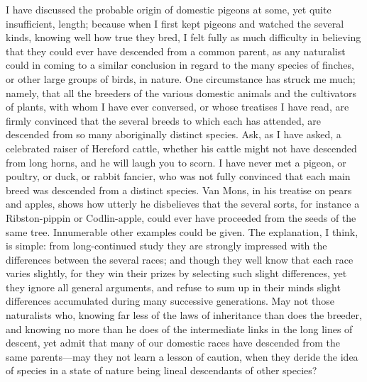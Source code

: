 \documentclass{book}
\begin{document}
I have discussed the probable origin of domestic pigeons at some, yet quite
insufficient, length; because when I first kept pigeons and watched the several
kinds, knowing well how true they bred, I felt fully as much difficulty in
believing that they could ever have descended from a common parent, as any
naturalist could in coming to a similar conclusion in regard to the many
species of finches, or other large groups of birds, in nature. One circumstance
has struck me much; namely, that all the breeders of the various domestic
animals and the cultivators of plants, with whom I have ever conversed, or
whose treatises I have read, are firmly convinced that the several breeds to
which each has attended, are descended from so many aboriginally distinct
species.
Ask, as I have asked, a celebrated raiser of Hereford cattle, whether his
cattle might not have descended from long horns, and he will laugh you to
scorn. I have never met a pigeon, or poultry, or duck, or rabbit fancier, who
was not fully convinced that each main breed was descended from a distinct
species. Van Mons, in his treatise on pears and apples, shows how utterly he
disbelieves that the several sorts, for instance a Ribston-pippin or
Codlin-apple, could ever have proceeded from the seeds of the same tree.
Innumerable other examples could be given. The explanation, I think, is simple:
from long-continued study they are strongly impressed with the differences
between the several races; and though they well know that each race varies
slightly, for they win their prizes by selecting such slight differences, yet
they ignore all general arguments, and refuse to sum up in their minds slight
differences accumulated during many successive generations. May not those
naturalists who, knowing far less of the laws of inheritance than does the
breeder, and knowing no more than he does of the intermediate links in the long
lines of descent, yet admit that many of our domestic races have descended from
the same parents---may they not learn a lesson of caution, when they deride
the idea of species in a state of nature being lineal descendants of other
species?
\end{document}
